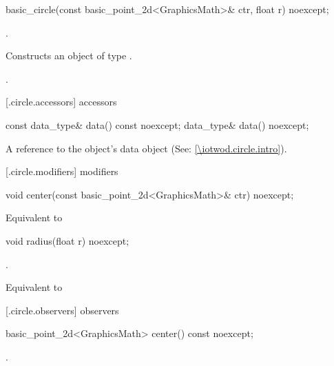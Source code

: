 %
\begin{itemdecl}
basic_circle(const basic_point_2d<GraphicsMath>& ctr, float r) noexcept;
\end{itemdecl}
\begin{itemdescr}
\requires
{}.

\pnum
\effects
Constructs an object of type .

\pnum
\postconditions
{}.
\end{itemdescr}

 [\iotwod.circle.accessors]{ accessors}

%
\begin{itemdecl}
const data_type& data() const noexcept;
data_type& data() noexcept;
\end{itemdecl}
\begin{itemdescr}
\pnum
\returns
A reference to the  object's data object (See: \ref{\iotwod.circle.intro}).
\end{itemdescr}

 [\iotwod.circle.modifiers]{ modifiers}

%
\begin{itemdecl}
void center(const basic_point_2d<GraphicsMath>& ctr) noexcept;
\end{itemdecl}

\begin{itemdescr}
\pnum
\effects
Equivalent to 
\end{itemdescr}

%
\begin{itemdecl}
void radius(float r) noexcept;
\end{itemdecl}
\begin{itemdescr}
\requires
{}.

\pnum
\effects
Equivalent to 
\end{itemdescr}

 [\iotwod.circle.observers]{ observers}

%
\begin{itemdecl}
basic_point_2d<GraphicsMath> center() const noexcept;
\end{itemdecl}
\begin{itemdescr}
\pnum
\returns
{}.
\end{itemdescr}

